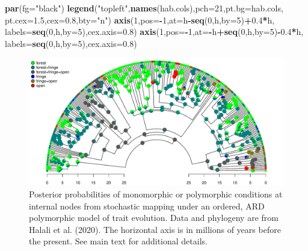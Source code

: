 \documentclass[fleqn,10pt,lineno]{wlpeerj} %
\newenvironment{Shaded}{\begin{snugshade}}{\end{snugshade}}
\newcommand{\AttributeTok}[1]{\textcolor[rgb]{0.13,0.29,0.53}{#1}}
\newcommand{\DecValTok}[1]{\textcolor[rgb]{0.00,0.00,0.81}{#1}}
\newcommand{\FloatTok}[1]{\textcolor[rgb]{0.00,0.00,0.81}{#1}}
\newcommand{\FunctionTok}[1]{\textcolor[rgb]{0.13,0.29,0.53}{\textbf{#1}}}
\newcommand{\NormalTok}[1]{#1}
\newcommand{\SpecialCharTok}[1]{\textcolor[rgb]{0.81,0.36,0.00}{\textbf{#1}}}
\newcommand{\StringTok}[1]{\textcolor[rgb]{0.31,0.60,0.02}{#1}}
\begin{document}
\begin{Shaded}
\begin{Highlighting}[]
\FunctionTok{par}\NormalTok{(}\AttributeTok{fg=}\StringTok{"black"}\NormalTok{)}
\FunctionTok{legend}\NormalTok{(}\StringTok{"topleft"}\NormalTok{,}\FunctionTok{names}\NormalTok{(hab.cols),}\AttributeTok{pch=}\DecValTok{21}\NormalTok{,}\AttributeTok{pt.bg=}\NormalTok{hab.cols,}
  \AttributeTok{pt.cex=}\FloatTok{1.5}\NormalTok{,}\AttributeTok{cex=}\FloatTok{0.8}\NormalTok{,}\AttributeTok{bty=}\StringTok{"n"}\NormalTok{)}
\FunctionTok{axis}\NormalTok{(}\DecValTok{1}\NormalTok{,}\AttributeTok{pos=}\SpecialCharTok{{-}}\DecValTok{1}\NormalTok{,}\AttributeTok{at=}\NormalTok{h}\SpecialCharTok{{-}}\FunctionTok{seq}\NormalTok{(}\DecValTok{0}\NormalTok{,h,}\AttributeTok{by=}\DecValTok{5}\NormalTok{)}\SpecialCharTok{+}\FloatTok{0.4}\SpecialCharTok{*}\NormalTok{h,}
  \AttributeTok{labels=}\FunctionTok{seq}\NormalTok{(}\DecValTok{0}\NormalTok{,h,}\AttributeTok{by=}\DecValTok{5}\NormalTok{),}\AttributeTok{cex.axis=}\FloatTok{0.8}\NormalTok{)}
\FunctionTok{axis}\NormalTok{(}\DecValTok{1}\NormalTok{,}\AttributeTok{pos=}\SpecialCharTok{{-}}\DecValTok{1}\NormalTok{,}\AttributeTok{at=}\SpecialCharTok{{-}}\NormalTok{h}\SpecialCharTok{+}\FunctionTok{seq}\NormalTok{(}\DecValTok{0}\NormalTok{,h,}\AttributeTok{by=}\DecValTok{5}\NormalTok{)}\SpecialCharTok{{-}}\FloatTok{0.4}\SpecialCharTok{*}\NormalTok{h,}
  \AttributeTok{labels=}\FunctionTok{seq}\NormalTok{(}\DecValTok{0}\NormalTok{,h,}\AttributeTok{by=}\DecValTok{5}\NormalTok{),}\AttributeTok{cex.axis=}\FloatTok{0.8}\NormalTok{)}
\end{Highlighting}
\end{Shaded}

\begin{figure}
\includegraphics[width=1\linewidth]{Revell.phytools-v2_peerj_files/figure-latex/anc-fitpolyMk-1} \caption{Posterior probabilities of monomorphic or polymorphic conditions at internal nodes from stochastic mapping under an ordered, ARD polymorphic model of trait evolution. Data and phylogeny are from Halali et al. (2020).  The horizontal axis is in millions of years before the present. See main text for additional details.}\label{fig:anc-fitpolyMk}
\end{figure}
\end{document}
